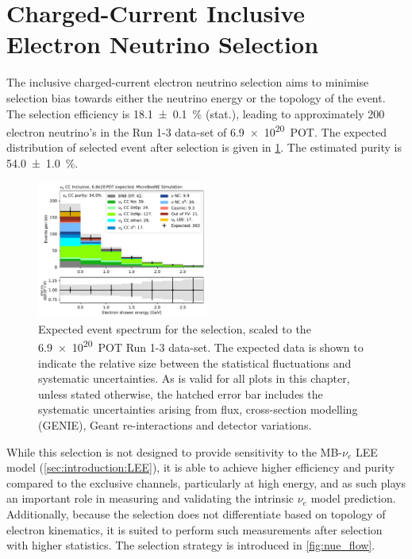 \section{Charged-Current Inclusive Electron Neutrino Selection }
\label{sec:nueselection:inclusive}

\newcommand{\pct}[1]{\SI{#1}{\%}}
\newcommand{\syst}{systematic uncertainty\xspace}
\newcommand{\systs}{systematic uncertainties\xspace}
\newcommand{\unbpot}{\SI{5.5e19}{POT}\xspace}
\newcommand{\fullpot}{\SI{6.9e20}{POT}\xspace}

The inclusive charged-current electron neutrino selection aims to minimise selection bias towards either the neutrino energy or the topology of the event. The selection efficiency is \pct{18.1+-0.1} (stat.), leading to approximately 200 electron neutrino's in the Run 1-3 data-set of \fullpot. The expected distribution of selected event after selection is given in \cref{fig:nuecc:expected}. The estimated \nuecc purity is \pct{54.0+-1.0}.

\begin{figure}[H]
    \centering
    \includegraphics[width = 0.5\textwidth]{NueCCsel/Images/truth/intro_plot_scaled.pdf}
    \caption{Expected event spectrum for the \nuecc selection, scaled to the \fullpot Run 1-3 data-set. The expected data is shown to indicate the relative size between the statistical fluctuations and \systs. As is valid for all plots in this chapter, unless stated otherwise, the hatched error bar includes the systematic uncertainties arising from flux, cross-section modelling (GENIE), Geant re-interactions and detector variations.}
    \label{fig:nuecc:expected}
\end{figure}

While this selection is not designed to provide sensitivity to the MB-$\nu_e$ LEE model (\cref{sec:introduction:LEE}), it is able to achieve higher efficiency and purity compared to the exclusive channels, particularly at high energy, and as such plays an important role in measuring and validating the intrinsic $\nu_e$ model prediction. Additionally, because the selection does not differentiate based on topology of electron kinematics, it is suited to perform such measurements after selection with higher statistics. The selection strategy is introduced in \cref{fig:nue_flow}. 

